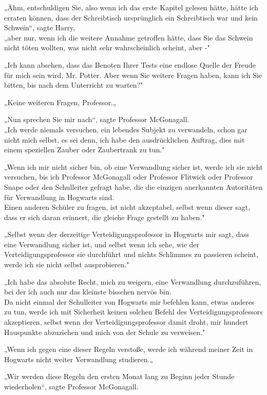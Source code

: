 {„Ähm, entschuldigen Sie, also wenn ich das erste Kapitel gelesen hätte, hätte ich erraten können, dass der Schreibtisch ursprünglich ein Schreibtisch war und kein Schwein“, sagte Harry,\\ „aber nur, wenn ich die weitere Annahme getroffen hätte, dass Sie das Schwein nicht töten wollten, was nicht sehr wahrscheinlich scheint, aber -"

„Ich kann absehen, dass das Benoten Ihrer Tests eine endlose Quelle der Freude für mich sein wird, Mr. Potter. Aber wenn Sie weitere Fragen haben, kann ich Sie bitten, bis nach dem Unterricht zu warten?"

„Keine weiteren Fragen, Professor.„

„Nun sprechen Sie mir nach“, sagte Professor McGonagall.\\ „Ich werde niemals versuchen, ein lebendes Subjekt zu verwandeln, schon gar nicht mich selbst, es sei denn, ich habe den ausdrücklichen Auftrag, dies mit einem speziellen Zauber oder Zaubertrank zu tun."

„Wenn ich mir nicht sicher bin, ob eine Verwandlung sicher ist, werde ich sie nicht versuchen, bis ich Professor McGonagall oder Professor Flitwick oder Professor Snape oder den Schulleiter gefragt habe, die die einzigen anerkannten Autoritäten für Verwandlung in Hogwarts sind.\\ Einen anderen Schüler zu fragen, ist nicht akzeptabel, selbst wenn dieser sagt, dass er sich daran erinnert, die gleiche Frage gestellt zu haben."

„Selbst wenn der derzeitige Verteidigungsprofessor in Hogwarts mir sagt, dass eine Verwandlung sicher ist, und selbst wenn ich sehe, wie der Verteidigungsprofessor sie durchführt und nichts Schlimmes zu passieren scheint, werde ich sie nicht selbst ausprobieren."

„Ich habe das absolute Recht, mich zu weigern, eine Verwandlung durchzuführen, bei der ich auch nur das kleinste bisschen nervös bin.\\ Da nicht einmal der Schulleiter von Hogwarts mir befehlen kann, etwas anderes zu tun, werde ich mit Sicherheit keinen solchen Befehl des Verteidigungsprofessors akzeptieren, selbst wenn der Verteidigungsprofessor damit droht, mir hundert Hauspunkte abzuziehen und mich von der Schule zu verweisen."

„Wenn ich gegen eine dieser Regeln verstoße, werde ich während meiner Zeit in Hogwarts nicht weiter Verwandlung studieren.„

„Wir werden diese Regeln den ersten Monat lang zu Beginn jeder Stunde wiederholen“, sagte Professor McGonagall.

}
